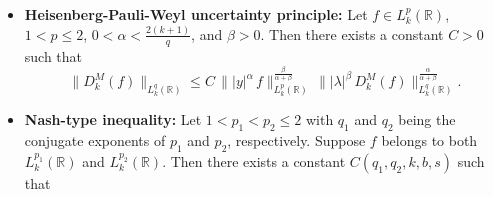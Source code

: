 \documentclass[12pt,a4paper,reqno]{amsproc}
\theoremstyle{definition}
\theoremstyle{remark}
\numberwithin{equation}{section}
\begin{document}
\begin{itemize}
\item \textbf{Heisenberg-Pauli-Weyl uncertainty principle:} Let $f\in L^p_k(\mathbb{R})$,\, $1<p\le2$, $0<\alpha<\frac{2(k+1)}{q}$, and $\beta>0$. Then there exists a constant $C>0$ such that 
\begin{equation*}
    \|D_k^M(f)\|_{L^{q}_k(\mathbb{R})} \le C\, \||y|^\alpha\,f\|^{\frac{\beta}{\alpha+\beta}}_{L_k^p(\mathbb{R})}\, \||\lambda|^\beta\, D_k^M(f)\|^{\frac{\alpha}{\alpha+\beta}}_{L_k^{q}(\mathbb{R})}. 
\end{equation*}
\item \textbf{Nash-type inequality:} Let $1<p_1<p_2\le2$ with $q_1$ and $q_2$ being the conjugate exponents of $p_1$ and $p_2$, respectively. Suppose $f$ belongs to both $ L_k^{p_1}(\mathbb{R})$ and $ L_k^{p_2}(\mathbb{R})$. Then there exists a constant $C(q_1,q_2,k,b,s)$ such that


\end{itemize}
\end{document}

